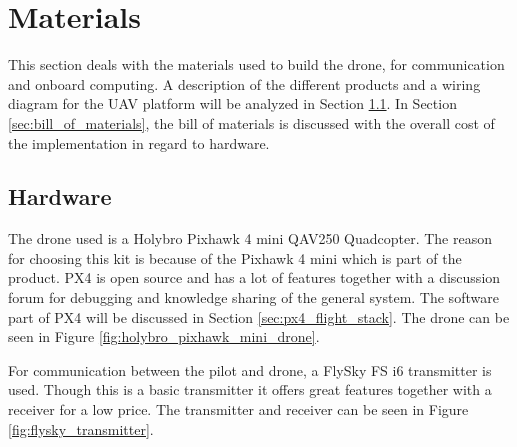 \documentclass[../Head/report.tex]{subfiles}
\begin{document}


\lstset{style=mystyle}

\section{Materials}
This section deals with the materials used to build the drone, for communication and onboard computing. A description of the different products and a wiring diagram for the UAV platform will be analyzed in Section \ref{sec:hardware}. In Section \ref{sec:bill_of_materials}, the bill of materials is discussed with the overall cost of the implementation in regard to hardware.   

\subsection{Hardware}
\label{sec:hardware}

The drone used is a Holybro Pixhawk 4 mini QAV250 Quadcopter. The reason for choosing this kit is because of the Pixhawk 4 mini which is part of the product. PX4 is open source and has a lot of features together with a discussion forum for debugging and knowledge sharing of the general system. The software part of PX4 will be discussed in Section \ref{sec:px4_flight_stack}. The drone can be seen in Figure \ref{fig:holybro_pixhawk_mini_drone}. 

For communication between the pilot and drone, a FlySky FS i6 transmitter is used. Though this is a basic transmitter it offers great features together with a receiver for a low price. The transmitter and receiver can be seen in Figure \ref{fig:flysky_transmitter}. 
\end{document}
